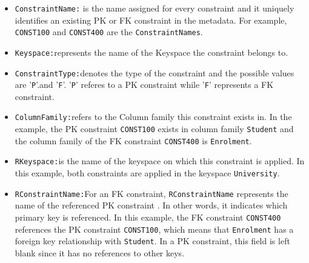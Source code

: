 \begin{itemize}
  
  \item \texttt{ConstraintName:} is the name assigned for
  every constraint and it uniquely identifies an
  existing \ac{PK} or \ac{FK} constraint in the metadata. 
  For example,  \texttt{CONST100} and \texttt{CONST400} are the \texttt{ConstraintNames}. 
    
  
  \item \texttt{Keyspace:}represents the name of the Keyspace the constraint
  belongs to. 
  
  \item \texttt{ConstraintType:}denotes the type of the constraint and the
  possible values are '\texttt{P}'.and '\texttt{F}'.
  '\texttt{P}' referes to  a \ac{PK} constraint while '\texttt{F}' represents  a
   \ac{FK} constraint. 
   
 
  
  \item \texttt{ColumnFamily:}refers to the Column family this constraint
  exists in. 
  In the example,  the \ac{PK} constraint
  \texttt{CONST100}  exists in column family \texttt{Student} and the column
  family of the \ac{FK} constraint \texttt{CONST400}
  is \texttt{Enrolment}.
  
  \item \texttt{RKeyspace:}is the name of the keyspace on which this constraint
  is applied.  In this example,  both constraints
  are applied in  the keyspace \texttt{University}.  
  
  \item \texttt{RConstraintName:}For an \ac{FK}
  constraint,  \texttt{RConstraintName} represents the name of the
  referenced \ac{PK} constraint . In other words, it indicates which primary key
  is referenced.
  In this example,  the \ac{FK} constraint \texttt{CONST400} references the
  \ac{PK} constraint \texttt{CONST100},  which means that \texttt{Enrolment} has
  a foreign key relationship with \texttt{Student}.  In a \ac{PK} constraint,  this field is
  left blank since it has no references to other keys.
  

\end{itemize}
